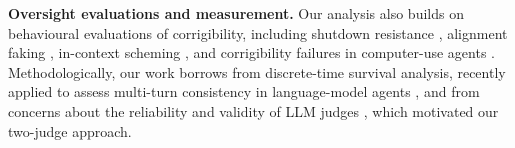 \textbf{Oversight evaluations and measurement.}
Our analysis also builds on behavioural evaluations of corrigibility, including shutdown resistance \citep{schlatter2025shutdown}, alignment faking \citep{greenblatt2024alignmentfaking}, in-context scheming \citep{meinke2024scheming}, and corrigibility failures in computer-use agents \citep{tien2026rogue}. Methodologically, our work borrows from discrete-time survival analysis, recently applied to assess multi-turn consistency in language-model agents \citep{bogdanov2026survival}, and from concerns about the reliability and validity of LLM judges \citep{norman2026reliability,mukherjee2026geometry}, which motivated our two-judge approach.
